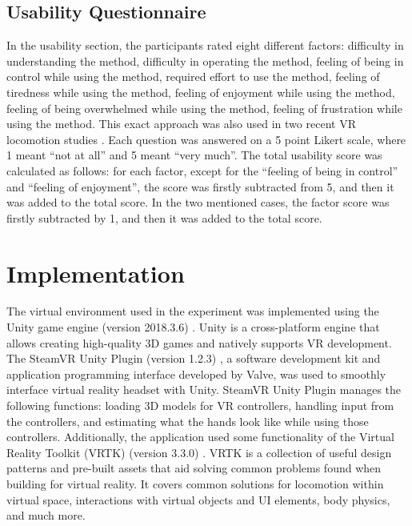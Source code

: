 \subsection{Usability Questionnaire}

In the usability section, the participants rated eight different factors: difficulty in understanding the method, difficulty in operating the method, feeling of being in control while using the method, required effort to use the method, feeling of tiredness while using the method, feeling of enjoyment while using the method, feeling of being overwhelmed while using the method, feeling of frustration while using the method. This exact approach was also used in two recent VR locomotion studies \cite{TELEPORTATIONSTUDY}\cite{NODEBASEDTELEPORTATION}. Each question was answered on a 5 point Likert scale, where 1 meant ``not at all'' and 5 meant ``very much''. The total usability score was calculated as follows: for each factor, except for the ``feeling of being in control'' and ``feeling of enjoyment'', the score was firstly subtracted from 5, and then it was added to the total score. In the two mentioned cases, the factor score was firstly subtracted by 1, and then it was added to the total score.

\section{Implementation}

The virtual environment used in the experiment was implemented using the Unity game engine (version 2018.3.6) \cite{UNITY}. Unity is a cross-platform engine that allows creating high-quality 3D games and natively supports VR development. The SteamVR Unity Plugin (version 1.2.3) \cite{STEAMVR}, a software development kit and application programming interface developed by Valve, was used to smoothly interface virtual reality headset with Unity. SteamVR Unity Plugin manages the following functions: loading 3D models for VR controllers, handling input from the controllers, and estimating what the hands look like while using those controllers. Additionally, the application used some functionality of the Virtual Reality Toolkit (VRTK) (version 3.3.0) \cite{VRTK}. VRTK is a collection of useful design patterns and pre-built assets that aid solving common problems found when building for virtual reality. It covers common solutions for locomotion within virtual space, interactions with virtual objects and UI elements, body physics, and much more. 

